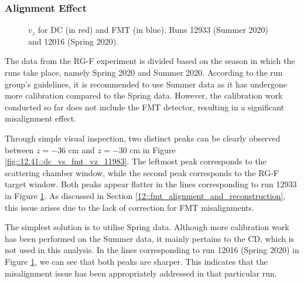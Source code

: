 \subsubsection{Alignment Effect}
\label{14.11::alignment_effect}

    \begin{figure}[b!]
        \caption[$v_z$ for DC and FMT, runs 12933 and 12016]
        {$v_z$ for DC (in red) and FMT (in blue).
        Runs 12933 (Summer 2020) and 12016 (Spring 2020).}
        \label{fig::14.11::vz_seasons}
    \end{figure}

    The data from the RG-F experiment is divided based on the season in which the runs take place, namely Spring 2020 and Summer 2020.
    According to the run group's guidelines, it is recommended to use Summer data as it has undergone more calibration compared to the Spring data.
    However, the calibration work conducted so far does not include the FMT detector, resulting in a significant misalignment effect.

    Through simple visual inspection, two distinct peaks can be clearly observed between $z = -36$ cm and $z = -30$ cm in Figure \ref{fig::12.41::dc_vs_fmt_vz_11983}.
    The leftmost peak corresponds to the scattering chamber window, while the second peak corresponds to the RG-F target window.
    Both peaks appear flatter in the lines corresponding to run 12933 in Figure \ref{fig::14.11::vz_seasons}.
    As discussed in Section \ref{12::fmt_alignment_and_reconstruction}, this issue arises due to the lack of correction for FMT misalignments.

    The simplest solution is to utilise Spring data.
    Although more calibration work has been performed on the Summer data, it mainly pertains to the CD, which is not used in this analysis.
    In the lines corresponding to run 12016 (Spring 2020) in Figure \ref{fig::14.11::vz_seasons}, we can see that both peaks are sharper.
    This indicates that the misalignment issue has been appropriately addressed in that particular run.
